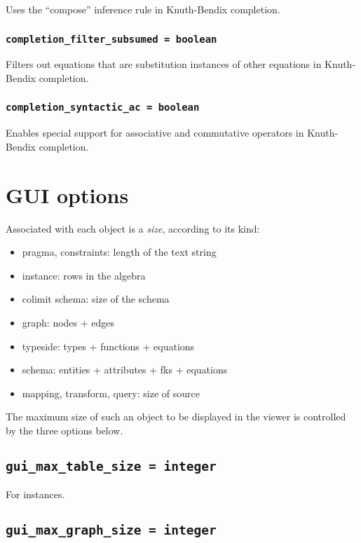 \documentclass[10pt]{book}
\begin{document}
Uses the ``compose'' inference rule in Knuth-Bendix completion.

\subsubsection{{\tt completion\_filter\_subsumed = boolean}}

Filters out equations that are substitution instances of other equations in Knuth-Bendix completion.

\subsubsection{{\tt completion\_syntactic\_ac = boolean}}

Enables special support for associative and commutative operators in Knuth-Bendix completion.

\section{GUI options}

Associated with each object is a {\it size}, according to its kind:
\begin{itemize}
\item pragma, constraints: length of the text string
\item instance: rows in the algebra
\item colimit schema: size of the schema
\item graph: nodes + edges
\item typeside: types + functions + equations
\item schema: entities + attributes + fks + equations
\item mapping, transform, query: size of source
\end{itemize}

The maximum size of such an object to be displayed in the viewer is controlled by the three options below.

\subsection{{\tt gui\_max\_table\_size = integer}}

For instances.

\subsection{{\tt gui\_max\_graph\_size = integer}}
\end{document}
